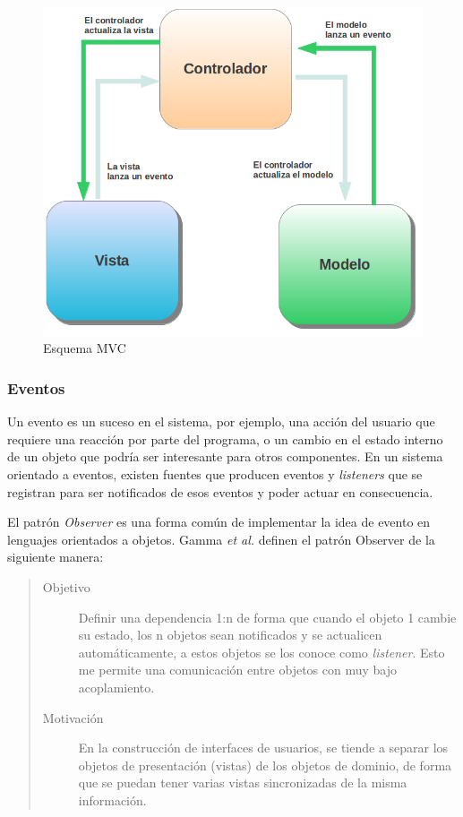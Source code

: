 	\begin{figure}[h]
		\centering
		\includegraphics[scale=0.35]{img/mvc} 
		\caption{Esquema MVC}
		\label{mvc}
	\end{figure}  
	
\subsubsection{Eventos}
\label{Eventos}

	Un evento es un suceso en el sistema, por ejemplo, una acción del usuario que
	requiere una reacción por parte del programa, o un cambio en el estado interno
	de un objeto que podría ser interesante para otros componentes.
	En un sistema orientado a eventos, existen fuentes que producen eventos y
	\emph{listeners} que se registran para ser notificados de esos eventos y poder
	actuar en consecuencia.

	El patrón \emph{Observer} es una forma común de implementar la
	idea de evento en lenguajes orientados a objetos.
	Gamma \emph{et al.} \cite{Gamma1995} definen el patrón Observer de la siguiente
	manera:
	
	\begin{quote}
	
	\begin{description}
	   
	\item [Objetivo] Definir una dependencia 1:n de forma que cuando el objeto
		1 cambie su estado, los n objetos sean notificados y se actualicen
		automáticamente, a estos objetos se los conoce como \emph{listener}. Esto me
		permite una comunicación entre objetos con muy bajo acoplamiento.
	
	\item [Motivación] En la construcción de interfaces de usuarios, se tiende
		a separar los objetos de presentación (vistas) de los objetos de dominio, de
		forma que se puedan tener varias vistas sincronizadas de la misma información.
	
	\end{description}
	\end{quote}
	
